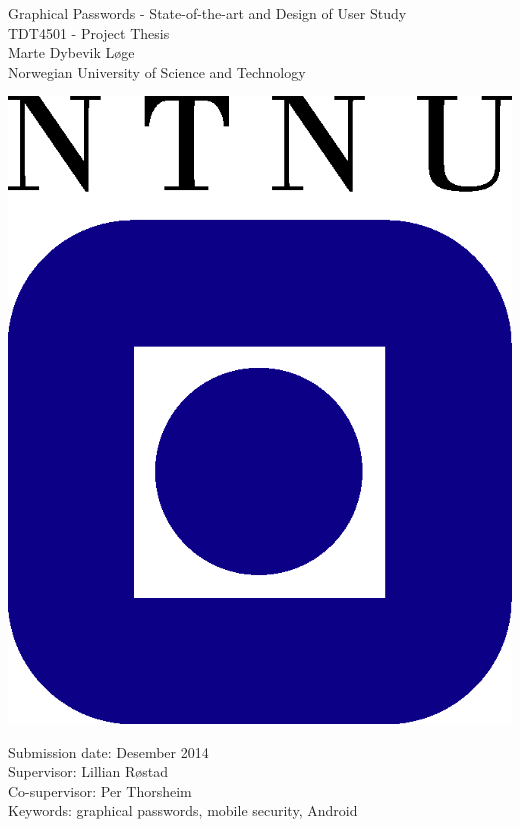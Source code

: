 \begin{titlepage}
\begin{center}

	{\Huge Graphical Passwords - State-of-the-art and Design of User Study} \\[0.4cm]


	{\Large TDT4501 - Project Thesis} \\[2.0cm]
	{\Large Marte Dybevik Løge} \\ [0.5cm]
	{\Large Norwegian University of Science and Technology}\\

	\vspace{3.0cm}

			\includegraphics{pics/ntnu-logo2.png}

	\vspace{3.0cm}

	{\Large Submission date: Desember 2014} \\[0.2cm]
	{\Large Supervisor: Lillian Røstad} \\ [0.2cm]
	{\Large Co-supervisor: Per Thorsheim} \\ [0.2cm]
	{\Large Keywords: graphical passwords, mobile security, Android}


\end{center}
\end{titlepage}